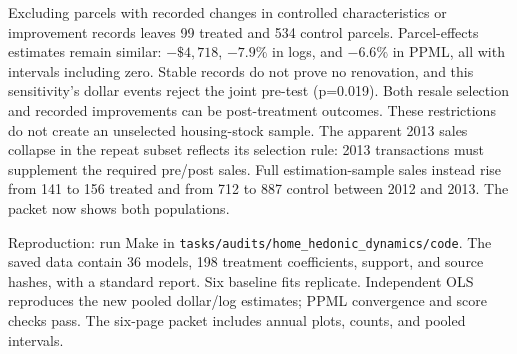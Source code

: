 Excluding parcels with recorded changes in controlled characteristics or
improvement records leaves 99 treated and 534 control parcels. Parcel-effects
estimates remain similar: $-\$4{,}718$, $-7.9\%$ in logs, and $-6.6\%$ in PPML,
all with intervals including zero. Stable records do not prove no renovation,
and this sensitivity's dollar events reject the joint pre-test (p=0.019).
Both resale selection and recorded improvements can be post-treatment
outcomes. These restrictions do not create an unselected housing-stock sample.
The apparent 2013 sales collapse in the repeat subset reflects its selection
rule: 2013 transactions must supplement the required pre/post sales. Full
estimation-sample sales instead rise from 141 to 156 treated and from 712 to
887 control between 2012 and 2013. The packet now shows both populations.

{\small Reproduction: run Make in
\texttt{tasks/audits/home\_hedonic\_dynamics/code}. The saved data contain
36 models, 198 treatment coefficients, support, and source hashes, with a
standard report. Six baseline fits replicate. Independent OLS reproduces
the new pooled dollar/log estimates; PPML convergence and score checks pass.
The six-page packet includes annual plots, counts, and pooled intervals.}
